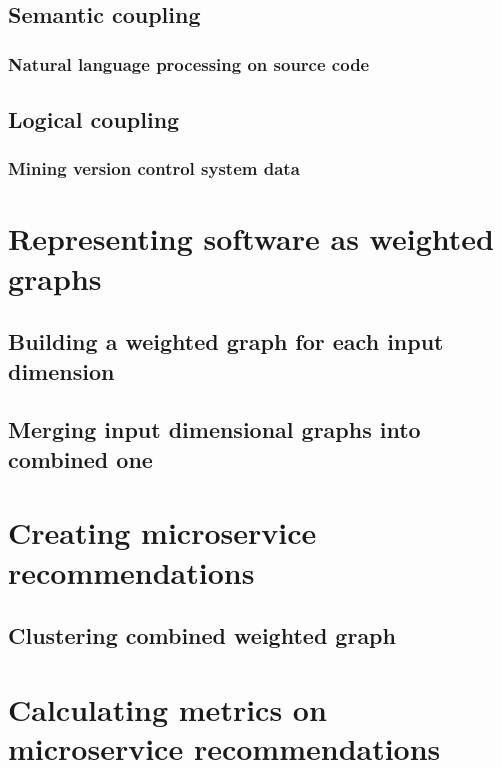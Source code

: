 \documentclass[12pt,a4paper]{report}
\begin{document}
\section{Semantic coupling}

\subsection{Natural language processing on source code}

\section{Logical coupling}

\subsection{Mining version control system data}




\chapter{Representing software as weighted graphs}

\section{Building a weighted graph for each input dimension}

\section{Merging input dimensional graphs into combined one}




\chapter{Creating microservice recommendations}

\section{Clustering combined weighted graph}




\chapter{Calculating metrics on microservice recommendations}
\end{document}
